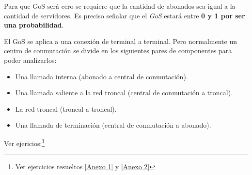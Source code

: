 \documentclass[11pt,fleqn]{book} %
\begin{document}
\begin{remark}
Para que GoS será cero se requiere que la cantidad de abonados sea igual a la cantidad de servidores. Es preciso señalar que el \textit{GoS} estará entre \textbf{0 y 1 por ser una probabilidad}.
\end{remark}
El GoS se aplica a una conexión de terminal a terminal. Pero normalmente un centro de conmutación se divide en los siguientes pares de componentes para poder analizarlos:
\begin{itemize}
\item Una llamada interna (abonado a central de conmutación).
\item Una llamada saliente a la red troncal (central de conmutación a troncal).
\item La red troncal (troncal a troncal).
\item Una llamada de terminación (central de conmutación a abonado).
\end{itemize}
Ver ejericios:\footnote{Ver ejercicios resueltos \ref{Anexo 1} y \ref{Anexo 2}}
\end{document}
